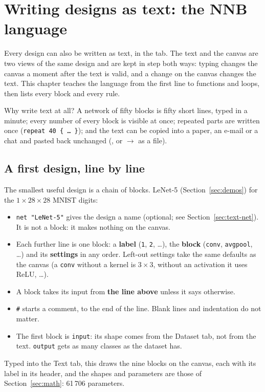 \section{Writing designs as text: the NNB language}
\label{sec:text}

Every design can also be written as text, in the  tab. The text and the canvas are two views of the same design and are kept in
step both ways: typing changes the canvas a moment after the text is valid, and a change on the canvas changes the text. This chapter
teaches the language from the first line to functions and loops, then lists every block and every rule.

Why write text at all? A network of fifty blocks is fifty short lines, typed in a minute; every number of every block is visible at once;
repeated parts are written once (\texttt{repeat 40 \{ \dots\ \}}); and the text can be copied into a paper, an e-mail or a chat and pasted
back unchanged (, or  $\rightarrow$  as a  file).

\subsection{A first design, line by line}
The smallest useful design is a chain of blocks. LeNet-5 (Section~\ref{sec:demos}) for the $1\times28\times28$ MNIST digits:


\begin{itemize}[nosep]
  \item \texttt{net "LeNet-5"} gives the design a name (optional; see Section~\ref{sec:text-net}). It is not a block: it makes nothing
        on the canvas.
  \item Each further line is one block: a \textbf{label} (\texttt{1}, \texttt{2}, \dots), the \textbf{block} (\texttt{conv},
        \texttt{avgpool}, \dots) and its \textbf{settings} in any order. Left-out settings take the same defaults as the canvas (a
        \texttt{conv} without a kernel is $3\times3$, without an activation it uses ReLU, \dots).
  \item A block takes its input from \textbf{the line above} unless it says otherwise.
  \item \texttt{\#} starts a comment, to the end of the line. Blank lines and indentation do not matter.
  \item The first block is \texttt{input}: its shape comes from the Dataset tab, not from the text. \texttt{output} gets as many
        classes as the dataset has.
\end{itemize}
Typed into the Text tab, this draws the nine blocks on the canvas, each with its label in its header, and the shapes and parameters are
those of Section~\ref{sec:math}: 61\,706 parameters.


